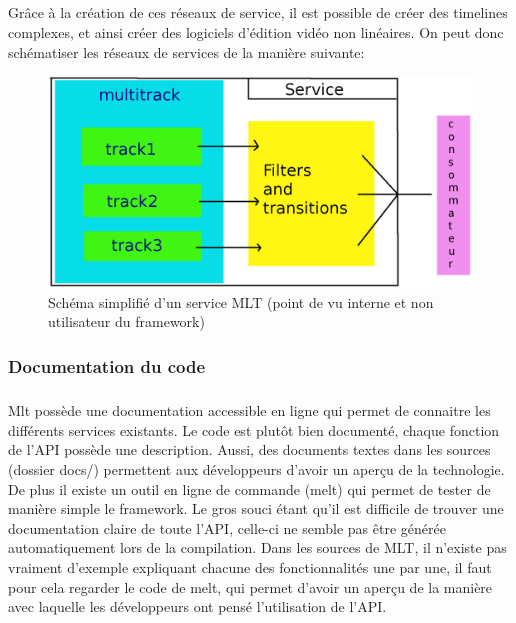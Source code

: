 \subparagraph{}

Grâce à la création de ces réseaux de service, il est possible de
créer des timelines complexes, et ainsi créer des logiciels d'édition
vidéo non linéaires. On peut donc schématiser les réseaux de services
de la manière suivante:

\begin{figure} [H]

  \begin{center}

    \includegraphics[width=1.0\textwidth]{images/service}

  \end{center}

  \caption{Schéma simplifié d'un service MLT (point de vu
  interne et
    non utilisateur du framework)}

  \label{Yes}

\end{figure}

\subsubsection{Documentation du code}

\subparagraph{}

Mlt possède une documentation accessible en ligne qui permet de
connaitre les différents services existants. Le code est plutôt bien
documenté, chaque fonction de l'API possède une description. Aussi,
des documents textes dans les sources (dossier docs/) permettent aux
développeurs d'avoir un aperçu de la technologie. De plus il existe
un outil en ligne de commande (melt) qui permet de tester de manière
simple le framework. Le gros souci étant qu'il est difficile de trouver
une documentation claire de toute l'API, celle-ci ne semble pas être
générée automatiquement lors de la compilation. Dans les sources de
MLT, il n'existe pas vraiment d'exemple expliquant chacune
des fonctionnalités une par une, il faut pour cela regarder le code
de melt, qui permet d'avoir un aperçu de la manière avec laquelle les
développeurs ont pensé l'utilisation de l'API.

